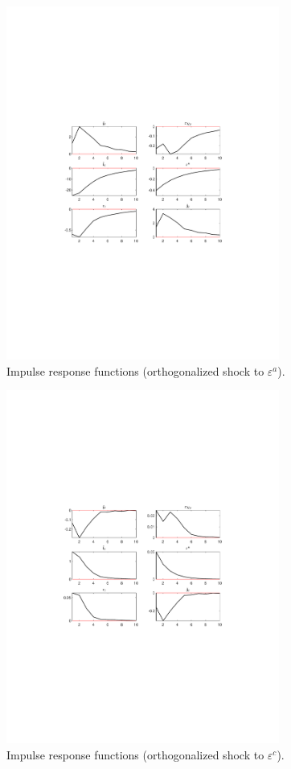  
\begin{figure}[H]
\centering 
\includegraphics[width=0.80\textwidth]{fiscal/graphs/fiscal_IRF_eps_a}
\caption{Impulse response functions (orthogonalized shock to ${\varepsilon^a}$).}
\label{Fig:IRF:eps_a}
\end{figure}
 
\begin{figure}[H]
\centering 
\includegraphics[width=0.80\textwidth]{fiscal/graphs/fiscal_IRF_eps_c_star}
\caption{Impulse response functions (orthogonalized shock to ${\varepsilon^c}$).}
\label{Fig:IRF:eps_c_star}
\end{figure}
 
